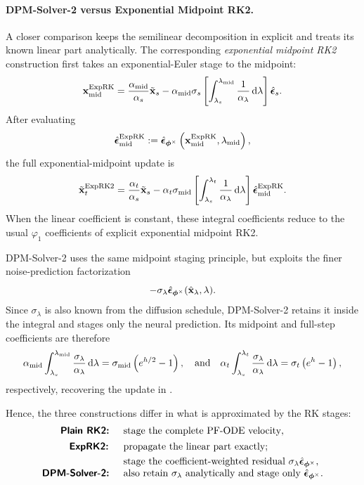 \paragraph{DPM-Solver-2 versus Exponential Midpoint RK2.}
A closer comparison keeps the semilinear decomposition in
 explicit and treats its known linear part
analytically. The corresponding \emph{exponential midpoint RK2} construction
first takes an exponential-Euler stage to the midpoint:
\[
{\mathbf{x}}_{\mathrm{mid}}^{\mathrm{ExpRK}}
=
\frac{\alpha_{\mathrm{mid}}}{\alpha_s}\tilde{{\mathbf{x}}}_s
-
\alpha_{\mathrm{mid}}\sigma_s
\left[
\int_{\lambda_s}^{\lambda_{\mathrm{mid}}}
\frac{1}{\alpha_\lambda}\mathop{}\!\mathrm{d}\lambda
\right]
\hat{{\bm{\epsilon}}}_s.
\]
After evaluating
\[
\hat{{\bm{\epsilon}}}_{\mathrm{mid}}^{\mathrm{ExpRK}}
:=
\hat{{\bm{\epsilon}}}_{\bm{\phi}^\times}
\left(
{\mathbf{x}}_{\mathrm{mid}}^{\mathrm{ExpRK}},
\lambda_{\mathrm{mid}}
\right),
\]
the full exponential-midpoint update is
\[
\tilde{{\mathbf{x}}}_t^{\mathrm{ExpRK2}}
=
\frac{\alpha_t}{\alpha_s}\tilde{{\mathbf{x}}}_s
-
\alpha_t\sigma_{\mathrm{mid}}
\left[
\int_{\lambda_s}^{\lambda_t}
\frac{1}{\alpha_\lambda}\mathop{}\!\mathrm{d}\lambda
\right]
\hat{{\bm{\epsilon}}}_{\mathrm{mid}}^{\mathrm{ExpRK}}.
\]
When the linear coefficient is constant, these integral coefficients reduce
to the usual $\varphi_1$ coefficients of explicit exponential midpoint RK2.

DPM-Solver-2 uses the same midpoint staging principle, but exploits the finer
noise-prediction factorization
\[
-\sigma_\lambda
\hat{{\bm{\epsilon}}}_{\bm{\phi}^\times}(\hat{{\mathbf{x}}}_\lambda,\lambda).
\]
Since $\sigma_\lambda$ is also known from the diffusion schedule,
DPM-Solver-2 retains it inside the integral and stages only the neural
prediction. Its midpoint and full-step coefficients are therefore
\[
\alpha_{\mathrm{mid}}
\int_{\lambda_s}^{\lambda_{\mathrm{mid}}}
\frac{\sigma_\lambda}{\alpha_\lambda}\mathop{}\!\mathrm{d}\lambda
=
\sigma_{\mathrm{mid}}
\left(e^{h/2}-1\right),
\quad \text{and}\quad
\alpha_t
\int_{\lambda_s}^{\lambda_t}
\frac{\sigma_\lambda}{\alpha_\lambda}\mathop{}\!\mathrm{d}\lambda
=
\sigma_t
\left(e^h-1\right),
\]
respectively, recovering the update in .

Hence, the three constructions differ in what is approximated by the RK
stages:
\[
\begin{array}{rl}
\text{{\sffamily\textbf{Plain RK2:}} }
&
\text{stage the complete PF-ODE velocity},
\\[4pt]

\textbf{{\sffamily\textbf{ExpRK2:}} }
&
\begin{aligned}[t]
&\text{propagate the linear part exactly;}\\
&\text{stage the coefficient-weighted residual }
\sigma_\lambda\hat{{\bm{\epsilon}}}_{\bm{\phi}^\times},
\end{aligned}
\\[6pt]

\text{{\sffamily\textbf{DPM-Solver-2:}} }
&
\text{also retain }\sigma_\lambda\text{ analytically and stage only }
\hat{{\bm{\epsilon}}}_{\bm{\phi}^\times}.
\end{array}
\]

